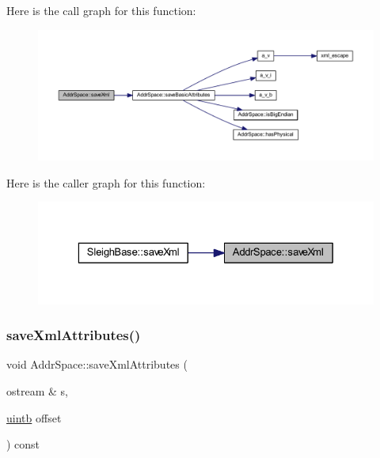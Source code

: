 Here is the call graph for this function\+:
\nopagebreak
\begin{figure}[H]
\begin{center}
\leavevmode
\includegraphics[width=350pt]{class_addr_space_ac073a4d446677c54d769abba01318864_cgraph}
\end{center}
\end{figure}
Here is the caller graph for this function\+:
\nopagebreak
\begin{figure}[H]
\begin{center}
\leavevmode
\includegraphics[width=329pt]{class_addr_space_ac073a4d446677c54d769abba01318864_icgraph}
\end{center}
\end{figure}
\mbox{\label{class_addr_space_a4475d64c56141adf80cb0aca5b23e3c6}} 
\subsubsection{\texorpdfstring{saveXmlAttributes()}{saveXmlAttributes()}\hspace{0.1cm}{\footnotesize\ttfamily [1/2]}}
{\footnotesize\ttfamily void Addr\+Space\+::save\+Xml\+Attributes (\begin{DoxyParamCaption}\item[{ostream \&}]{s,  }\item[{\mbox{\hyperlink{types_8h_a2db313c5d32a12b01d26ac9b3bca178f}{uintb}}}]{offset }\end{DoxyParamCaption}) const\hspace{0.3cm}{\ttfamily [virtual]}}



